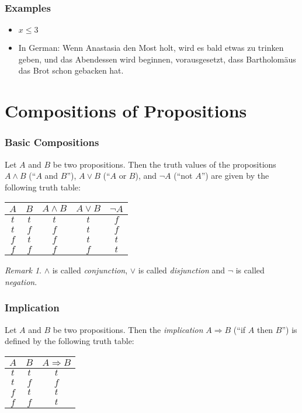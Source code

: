 \documentclass{beamer}
\theoremstyle{remark}
\newtheorem{remark}[theorem]{Remark}
\begin{document}
\begin{frame}
 \frametitle{Examples}
 
\begin{itemize}
	\item $x \leq 3$
	\pause
	\item In German: Wenn Anastasia den Most holt, wird es bald etwas zu trinken geben, und das Abendessen wird beginnen, vorausgesetzt, dass Bartholomäus das Brot schon gebacken hat.
\end{itemize}
\end{frame}


\section{Compositions of Propositions}
\begin{frame}
\frametitle{Basic Compositions}

\begin{definition}
Let $A$ and $B$ be two propositions. Then the truth values of the propositions $A \land B$ (``$A$ and $B$''), $A \lor B$ (``$A$ or $B$), and $\lnot A$ (``not $A$'') are given by the following truth table:


\begin{tabular}{c|c||c|c|c}
$A$ & $B$ & $A \land B$ & $A \lor B$ & $\lnot A$ \\ \hline \hline
$t$ & $t$ & \pause $t$ & $t$ & $f$ \\ \pause
$t$ & $f$ &  \pause $f$ & $t$ & $f$ \\ \pause
$f$ & $t$ &  \pause $f$ & $t$ & $t$ \\ \pause
$f$ & $f$ &  \pause $f$ & $f$ & $t$
\end{tabular}
\end{definition}

\pause
\begin{remark}
	$\land$ is called {\em conjunction}, $\lor$ is called {\em disjunction} and $\lnot$ is called {\em negation}.
\end{remark}

\end{frame}

\begin{frame}
\frametitle{Implication}
\begin{definition}
Let $A$ and $B$ be two propositions. Then the {\em implication} $A \Rightarrow B$ (``if $A$ then $B$'') is defined by the following truth table:
\pause
\begin{tabular}{c|c||c}
$A$ & $B$ & $A \Rightarrow B$ \\ \hline \hline
$t$ & $t$  \pause & $t$  \\
$t$ & $f$ \pause & $f$  \\
$f$ & $t$ \pause & $t$ \\
$f$ & $f$ \pause & $t$ 
\end{tabular}

\end{definition}
\end{frame}
\end{document}
